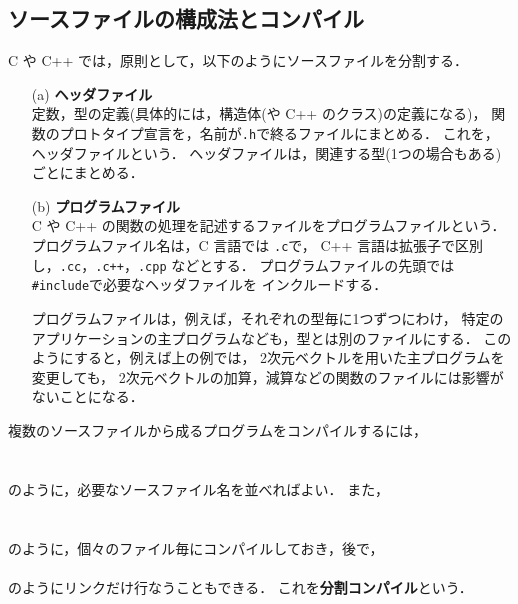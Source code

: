 \documentclass[11pt,a4,epsf]{jarticle}
\begin{document}
\begin{appendices}
\section{ソースファイルの構成法とコンパイル}

C や C++ では，原則として，以下のようにソースファイルを分割する．

\begin{enumerate}
 \item[(a)] {\bf ヘッダファイル}	\\
定数，型の定義(具体的には，構造体(や C++ のクラス)の定義になる)，
関数のプロトタイプ宣言を，名前が\verb+.h+で終るファイルにまとめる．
これを，ヘッダファイルという．
ヘッダファイルは，関連する型(1つの場合もある)ごとにまとめる．
 \item[(b)] {\bf プログラムファイル}	\\
C や C++ の関数の処理を記述するファイルをプログラムファイルという．
プログラムファイル名は，C 言語では \verb+.c+で，
C++ 言語は拡張子で区別し，\verb+.cc+，\verb|.c++|，\verb+.cpp+ などとする．
プログラムファイルの先頭では {\tt \#include}で必要なヘッダファイルを
インクルードする．

プログラムファイルは，例えば，それぞれの型毎に1つずつにわけ，
特定のアプリケーションの主プログラムなども，型とは別のファイルにする．
このようにすると，例えば上の例では，
2次元ベクトルを用いた主プログラムを変更しても，
2次元ベクトルの加算，減算などの関数のファイルには影響がないことになる．
\end{enumerate}

複数のソースファイルから成るプログラムをコンパイルするには，	\\
\hspace*{10mm}{\tt \% cc vector2c.c vec2ex1c.c}	\\
\hspace*{10mm}{\tt \% c++ vector2p.cpp vec2ex1p.cpp}	\\
のように，必要なソースファイル名を並べればよい．
また，\\
\hspace*{10mm}{\tt \% cc -c vector2c.c}	\\
\hspace*{10mm}{\tt \% cc -c vec2ex1c.c}	\\
のように，個々のファイル毎にコンパイルしておき，後で，	\\
\hspace*{10mm}{\tt \% cc vector2c.o vec2ex1c.o}	\\
のようにリンクだけ行なうこともできる．
これを{\bf 分割コンパイル}という．


\end{appendices}
\end{document}
